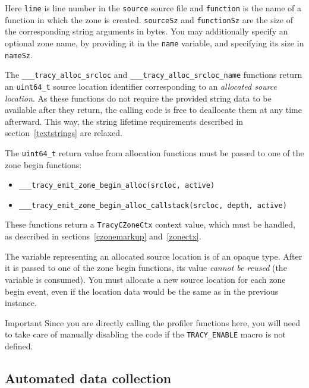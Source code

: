\documentclass[hidelinks,titlepage,a4paper]{article}
\begin{document}
Here \texttt{line} is line number in the \texttt{source} source file and \texttt{function} is the
name of a function in which the zone is created. \texttt{sourceSz} and \texttt{functionSz} are the
size of the corresponding string arguments in bytes. You may additionally specify an optional zone
name, by providing it in the \texttt{name} variable, and specifying its size in \texttt{nameSz}.

The \texttt{\_\_\_tracy\_alloc\_srcloc} and \texttt{\_\_\_tracy\_alloc\_srcloc\_name} functions
return an \texttt{uint64\_t} source location identifier corresponding to an \emph{allocated source
location}. As these functions do not require the provided string data to be available after they
return, the calling code is free to deallocate them at any time afterward. This way, the string
lifetime requirements described in section~\ref{textstrings} are relaxed.

The \texttt{uint64\_t} return value from allocation functions must be passed to one of the zone
begin functions:

\begin{itemize}
\item \texttt{\_\_\_tracy\_emit\_zone\_begin\_alloc(srcloc, active)}
\item \texttt{\_\_\_tracy\_emit\_zone\_begin\_alloc\_callstack(srcloc, depth, active)}
\end{itemize}


These functions return a \texttt{TracyCZoneCtx} context value, which must be handled, as described
in sections~\ref{czonemarkup} and~\ref{zonectx}.

The variable representing an allocated source location is of an opaque type. After it is passed to one of the zone begin functions, its value \emph{cannot be reused} (the variable is consumed). You must allocate a new source location for each zone begin event, even if the location data would be the same as in the previous instance.

\begin{bclogo}[
noborder=true,
couleur=black!5,
logo=\bcbombe
]{Important}
Since you are directly calling the profiler functions here, you will need to take care of manually
disabling the code if the \texttt{TRACY\_ENABLE} macro is not defined.
\end{bclogo}

\subsection{Automated data collection}
\label{automated}
\end{document}
